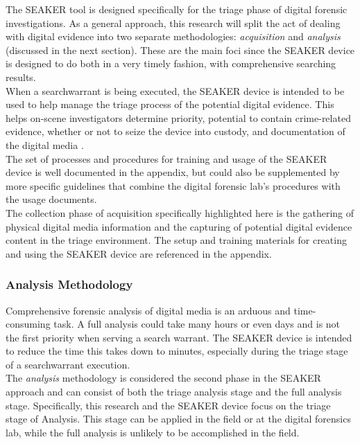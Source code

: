 \documentclass[12pt]{article}
\begin{document}
The SEAKER tool is designed specifically for the triage phase of digital forensic
investigations.  As a general approach, this research will split the act of dealing with digital evidence into two
separate methodologies: {\em acquisition} and {\em analysis} (discussed in the next section).
These are the main foci since the SEAKER
device is designed to do both in a very timely fashion, with comprehensive searching results.\\

When a \gls{searchwarrant} is being executed, the SEAKER device is intended to be used to help
manage the triage process of the potential digital evidence.  This helps on-scene investigators
determine priority, potential to contain crime-related evidence, whether or not to seize the
device into custody, and documentation of the digital media \cite{hitchcock2016tiered}.\\ 

The set of processes and procedures for training and usage of the SEAKER device is well
documented in the appendix, but could also be supplemented by more specific guidelines that
combine the digital forensic lab's procedures with the usage documents.\\

The collection phase of acquisition specifically highlighted here is the gathering
of physical digital media information and the capturing of potential digital evidence content
in the triage environment.  The setup and training materials for creating and using the
SEAKER device are referenced in the appendix.\\

\subsubsection{Analysis Methodology}

Comprehensive forensic analysis of digital media is an arduous and time-consuming task.  A full
analysis could take many hours or even days and is not the first priority when serving a search
warrant.  The SEAKER device is intended to reduce the time this takes down to minutes,
especially during the triage stage of a \gls{searchwarrant} execution.\\

The {\em analysis} methodology is considered the second phase in the SEAKER approach and 
can consist of both the triage analysis stage and the full analysis stage.
Specifically, this research and the SEAKER device focus on the triage stage of Analysis.  This
stage can be applied in the field or at the digital forensics lab, while the full analysis
is unlikely to be accomplished in the field.\\
\end{document}
